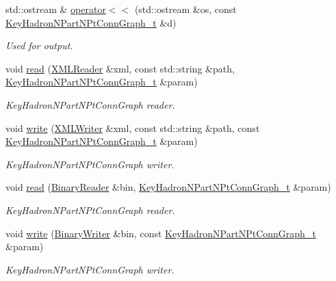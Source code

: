 \begin{DoxyCompactItemize}
std\+::ostream \& \mbox{\hyperlink{namespaceHadron_a6447e57d6b19af925c635187757e2f02}{operator$<$$<$}} (std\+::ostream \&os, const \mbox{\hyperlink{structHadron_1_1KeyHadronNPartNPtConnGraph__t}{Key\+Hadron\+N\+Part\+N\+Pt\+Conn\+Graph\+\_\+t}} \&d)
\begin{DoxyCompactList}\small\item\em Used for output. \end{DoxyCompactList}\item 
void \mbox{\hyperlink{namespaceHadron_a3250f56af4c72ab50d162f878b999c09}{read}} (\mbox{\hyperlink{classADATXML_1_1XMLReader}{X\+M\+L\+Reader}} \&xml, const std\+::string \&path, \mbox{\hyperlink{structHadron_1_1KeyHadronNPartNPtConnGraph__t}{Key\+Hadron\+N\+Part\+N\+Pt\+Conn\+Graph\+\_\+t}} \&param)
\begin{DoxyCompactList}\small\item\em Key\+Hadron\+N\+Part\+N\+Pt\+Conn\+Graph reader. \end{DoxyCompactList}\item 
void \mbox{\hyperlink{namespaceHadron_a25da56def6a3cbbe579c9b7b4d27e848}{write}} (\mbox{\hyperlink{classADATXML_1_1XMLWriter}{X\+M\+L\+Writer}} \&xml, const std\+::string \&path, const \mbox{\hyperlink{structHadron_1_1KeyHadronNPartNPtConnGraph__t}{Key\+Hadron\+N\+Part\+N\+Pt\+Conn\+Graph\+\_\+t}} \&param)
\begin{DoxyCompactList}\small\item\em Key\+Hadron\+N\+Part\+N\+Pt\+Conn\+Graph writer. \end{DoxyCompactList}\item 
void \mbox{\hyperlink{namespaceHadron_a5b83c233560cd9c25b2793cb89778c6d}{read}} (\mbox{\hyperlink{classADATIO_1_1BinaryReader}{Binary\+Reader}} \&bin, \mbox{\hyperlink{structHadron_1_1KeyHadronNPartNPtConnGraph__t}{Key\+Hadron\+N\+Part\+N\+Pt\+Conn\+Graph\+\_\+t}} \&param)
\begin{DoxyCompactList}\small\item\em Key\+Hadron\+N\+Part\+N\+Pt\+Conn\+Graph reader. \end{DoxyCompactList}\item 
void \mbox{\hyperlink{namespaceHadron_a0a1d03111d7a7c9ff16ee1baf1928652}{write}} (\mbox{\hyperlink{classADATIO_1_1BinaryWriter}{Binary\+Writer}} \&bin, const \mbox{\hyperlink{structHadron_1_1KeyHadronNPartNPtConnGraph__t}{Key\+Hadron\+N\+Part\+N\+Pt\+Conn\+Graph\+\_\+t}} \&param)
\begin{DoxyCompactList}\small\item\em Key\+Hadron\+N\+Part\+N\+Pt\+Conn\+Graph writer. \end{DoxyCompactList}\item 

\end{DoxyCompactItemize}
